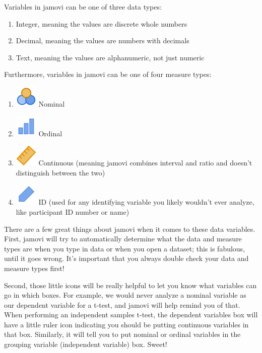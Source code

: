 \documentclass[
]{book}
\providecommand{\tightlist}{%
  \setlength{\itemsep}{0pt}\setlength{\parskip}{0pt}}
\begin{document}
Variables in jamovi can be one of three data types:

\begin{enumerate}
\def\labelenumi{\arabic{enumi}.}
\tightlist
\item
  Integer, meaning the values are discrete whole numbers
\item
  Decimal, meaning the values are numbers with decimals
\item
  Text, meaning the values are alphanumeric, not just numeric
\end{enumerate}

Furthermore, variables in jamovi can be one of four measure types:

\begin{enumerate}
\def\labelenumi{\arabic{enumi}.}
\item
  \includegraphics{images/03-jamovi/variable-nominal.png} Nominal
\item
  \includegraphics{images/03-jamovi/variable-ordinal.png} Ordinal
\item
  \includegraphics{images/03-jamovi/variable-continuous.png} Continuous (meaning jamovi combines interval and ratio and doesn't distinguish between the two)
\item
  \includegraphics{images/03-jamovi/variable-id.png} ID (used for any identifying variable you likely wouldn't ever analyze, like participant ID number or name)
\end{enumerate}

There are a few great things about jamovi when it comes to these data variables. First, jamovi will try to automatically determine what the data and measure types are when you type in data or when you open a dataset; this is fabulous, until it goes wrong. It's important that you always double check your data and measure types first!

Second, those little icons will be really helpful to let you know what variables can go in which boxes. For example, we would never analyze a nominal variable as our dependent variable for a t-test, and jamovi will help remind you of that. When performing an independent samples t-test, the dependent variables box will have a little ruler icon indicating you should be putting continuous variables in that box. Similarly, it will tell you to put nominal or ordinal variables in the grouping variable (independent variable) box. Sweet!
\end{document}
